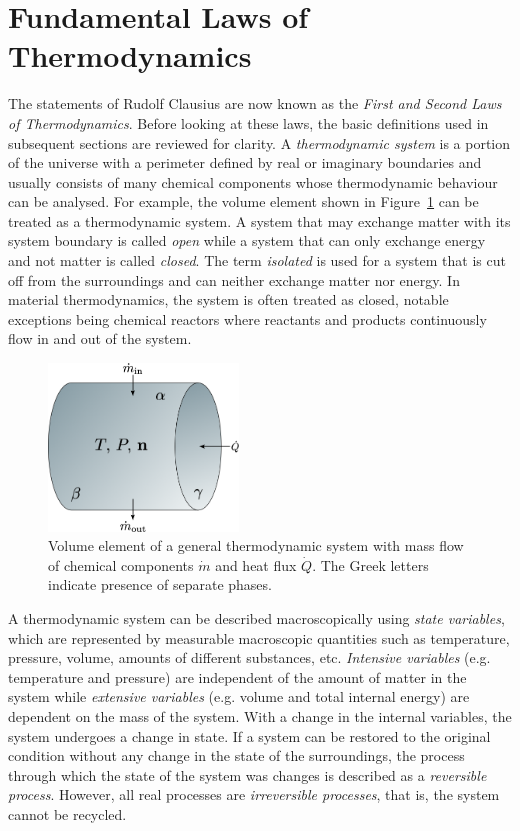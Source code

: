 \section{Fundamental Laws of Thermodynamics}
    The statements of Rudolf Clausius are now known as the \emph{First and Second Laws of Thermodynamics}. Before looking at these laws, the basic definitions used in subsequent sections are reviewed for clarity. A \emph{thermodynamic system} is a portion of the universe with a perimeter defined by real or imaginary boundaries and usually consists of many chemical components whose thermodynamic behaviour can be analysed. For example, the volume element shown in Figure~\ref{fig:system} can be treated as a thermodynamic system. A system that may exchange matter with its system boundary is called \emph{open} while a system that can only exchange energy and not matter is called \emph{closed}. The term \emph{isolated} is used for a system that is cut off from the surroundings and can neither exchange matter nor energy. In material thermodynamics, the system is often treated as closed, notable exceptions being chemical reactors where reactants and products continuously flow in and out of the system.
    \begin{figure}[htb]
        \centering
        \includegraphics[width=0.45\textwidth]{figures/chapter-3/system.png}
        \caption{Volume element of a general thermodynamic system with mass flow of chemical components $\dot{m}$ and heat flux $\dot{Q}$. The Greek letters indicate presence of separate phases.}
        \label{fig:system}
    \end{figure}

    A thermodynamic system can be described macroscopically using \emph{state variables}, which are represented by measurable macroscopic quantities such as temperature, pressure, volume, amounts of different substances, etc. \emph{Intensive variables} (e.g. temperature and pressure)  are independent of the amount of matter in the system  while  \emph{extensive variables} (e.g. volume and total internal energy) are dependent on the mass of the system.  With a change in the internal variables, the system undergoes a change in state. If a system can be restored to the original condition without any change in the state of the surroundings, the process through which the state of the system was changes is described as a \emph{reversible process}. However, all real processes are \emph{irreversible processes}, that is, the system cannot be recycled.

